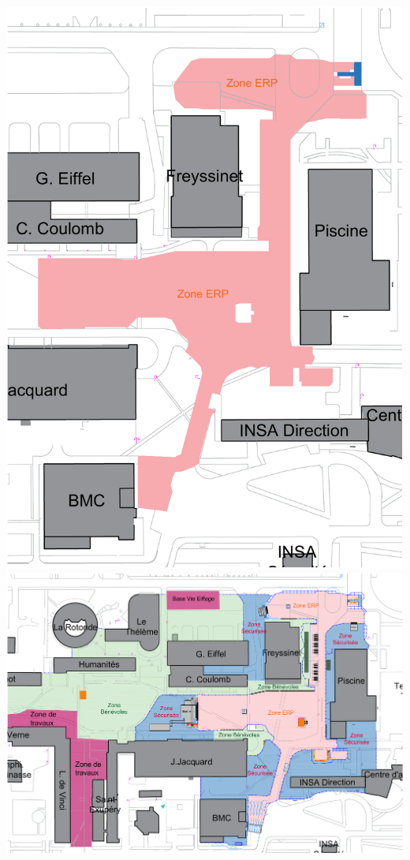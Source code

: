 \documentclass[hidelinks, paper=a4, fontsize=13pt]{report}
\begin{document}
\begin{center}
	\includegraphics[width=.8\textwidth,keepaspectratio]{Exports/Plan_24h_45eme-Plan_de_situation}
	\vspace{5mm}
	\includegraphics[angle=90,scale=0.7]{Exports/Plan_24h_45eme-Plan_ERP}
\end{center}
\end{document}
